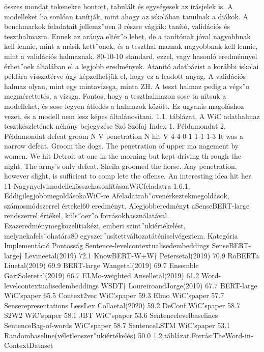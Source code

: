 \documentclass[12pt]{report}
\theoremstyle{definition}
\begin{document}
 összes mondat tokenekre bontott, tabulált és egységesek az írásjelek is. A modelleket ha
sonlóan tanítják, mint ahogy az iskolában tanulnak a diákok. A benchmarkok feladatait
 jellemz˝oen 3 részre vágják: tanító, validációs és teszthalmazra. Ennek az aránya eltér˝o
 lehet, de a tanítónak jóval nagyobbnak kell lennie, mint a másik kett˝onek, és a teszthal
maznak nagyobbnak kell lennie, mint a validációs halmaznak. 80-10-10%
 standard, ezzel, vagy hasonló eredménnyel érhet˝oek általában el a legjobb eredmények.
 Atanító adatbázist a korábbi iskolai példára visszatérve úgy képzelhetjük el, hogy
 ez a leadott anyag. A validációs halmaz olyan, mint egy mintavizsga, minta ZH. A teszt
halmaz pedig a végs˝o megmérettetés, a vizsga. Fontos, hogy a teszthalmazon sose ta
nítsuk a modelleket, és sose legyen átfedés a halmazok között. Ez ugyanis magoláshoz
 vezet, és a modell nem lesz képes általánosítani.
 1.1. táblázat. A WiC adathalmaz tesztkészletének néhány bejegyzése
 Szó
 Szófaj Index 1. Példamondat
 2. Példamondat
 defeat
 groom
 N
 V
 penetration N
 hit
 V
 4-4
 0-1
 1-1
 1-3
 It was a narrow defeat.
 Groom the dogs.
 The penetration of upper ma
nagement by women.
 We hit Detroit at one in the
 morning but kept driving th
rough the night.
 The army’s only defeat.
 Sheila groomed the horse.
 Any penetration, however
 slight, is sufficient to comp
lete the offense.
 An interesting idea hit her.
 11
NagynyelvimodellekösszehasonlításaaWiCfeladatra
 1.6.1. EddigilegjobbmegoldásokaWiC-re
 Afeladatrab˝ovenérkeztekmegoldások, számosmódszerrel értekel60%
 eredményt. Alegjobberedményt aSenseBERT-large rendszerrel értékel, küls˝oer˝o
forrásokhasználatával. Ezazeredménymegközelítiakézi, emberi szint˝ukiértékelést,
 melynekafels˝ohatára80%
 egyszer˝usítettváltozatáténiselvégeztem.
 Kategória Implementáció Pontosság%
 Sentence-levelcontextualisedembeddings
 SenseBERT-large† Levineetal(2019) 72.1
 KnowBERT-W+W† Petersetal(2019) 70.9
 RoBERTa Liuetal(2019) 69.9
 BERT-large Wangetal(2019) 69.7
 Ensemble GariSoleretal(2019) 66.7
 ELMo-weighted Anselletal(2019) 61.2
 Word-levelcontextualisedembeddings
 WSDT† LoureiroandJorge(2019) 67.7
 BERT-large WiC’spaper 65.5
 Context2vec WiC’spaper 59.3
 Elmo WiC’spaper 57.7
 Senserepresentations
 LessLex Collaetal(2020) 59.2
 DeConf WiC’spaper 58.7
 S2W2 WiC’spaper 58.1
 JBT WiC’spaper 53.6
 Sentencelevelbaselines
 SentenceBag-of-words WiC’spaper 58.7
 SentenceLSTM WiC’spaper 53.1
 Randombaseline(véletlenszer˝ukiértékelés)
 50.0
 1.2.táblázat.Forrás:TheWord-in-ContextDataset
\end{document}
